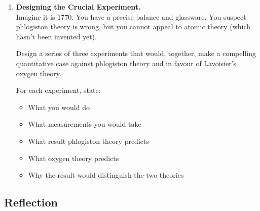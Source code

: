 \documentclass[12pt, a4paper]{book}
\theoremstyle{definition}
\begin{document}
\begin{deepbox}
\begin{enumerate}[label=\textbf{D\arabic*.}]
  \item \textbf{Designing the Crucial Experiment.}\\
        Imagine it is 1770.
        You have a precise balance and glassware.
        You suspect phlogiston theory is wrong,
        but you cannot appeal to atomic theory
        (which hasn't been invented yet).

        Design a series of three experiments that would,
        together, make a compelling quantitative case against
        phlogiston theory and in favour of Lavoisier's oxygen theory.

        For each experiment, state:
        \begin{itemize}[nosep]
          \item What you would do
          \item What measurements you would take
          \item What result phlogiston theory predicts
          \item What oxygen theory predicts
          \item Why the result would distinguish the two theories
        \end{itemize}

\end{enumerate}
\end{deepbox}

\subsection*{Reflection}
\end{document}
